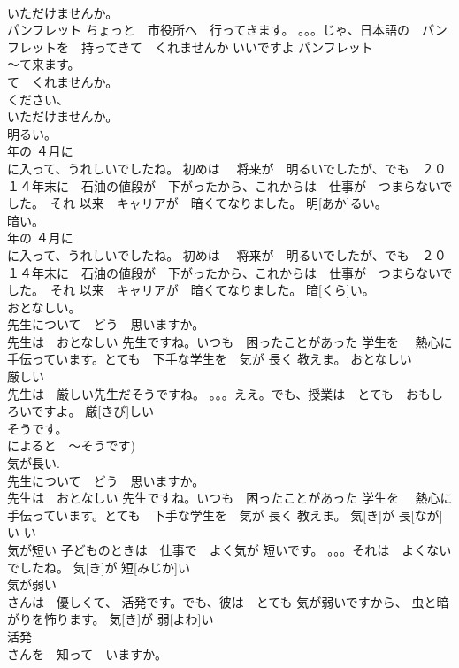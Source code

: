\documentclass[8pt]{extreport}
\begin{document}
\begin{CJK}{UTF8}{min}
\\	いただけませんか。	
\\	パンフレット	ちょっと　市役所へ　行ってきます。 。。。じゃ、日本語の　パンフレットを　持ってきて　くれませんか いいですよ	パンフレット			
\\	～て来ます。
\\	て　くれませんか。
\\	ください、
\\	いただけませんか。		
\\	明るい。	
\\	年の ４月に　 
\\	に入って、うれしいでしたね。 初めは　 将来が　明るいでしたが、でも　２０１４年末に　石油の値段が　下がったから、これからは　仕事が　つまらないでした。　それ 以来　キャリアが　暗くてなりました。	明[あか]るい。					
\\	暗い。	
\\	年の ４月に　 
\\	に入って、うれしいでしたね。 初めは　 将来が　明るいでしたが、でも　２０１４年末に　石油の値段が　下がったから、これからは　仕事が　つまらないでした。　それ 以来　キャリアが　暗くてなりました。	暗[くら]い。					
\\	おとなしい。	
\\	先生について　どう　思いますか。　 
\\	先生は　おとなしい 先生ですね。いつも　困ったことがあった 学生を　 熱心に手伝っています。とても　下手な学生を　気が 長く 教えま。	おとなしい			
\\	厳しい	
\\	先生は　厳しい先生だそうですね。 。。。ええ。でも、授業は　とても　おもしろいですよ。	厳[きび]しい				
\\	そうです。
\\	によると　～そうです)	
\\	気が長い.	
\\	先生について　どう　思いますか。　 
\\	先生は　おとなしい 先生ですね。いつも　困ったことがあった 学生を　 熱心に手伝っています。とても　下手な学生を　気が 長く 教えま。	気[き]が 長[なが]い				い	
\\	気が短い	子どものときは　仕事で　よく気が 短いです。 。。。それは　よくないでしたね。	気[き]が 短[みじか]い			
\\	気が弱い	
\\	さんは　優しくて、 活発です。でも、彼は　とても 気が弱いですから、 虫と暗がりを怖ります。	気[き]が 弱[よわ]い			
\\	活発	
\\	さんを　知って　いますか。

\end{CJK}
\end{document}

